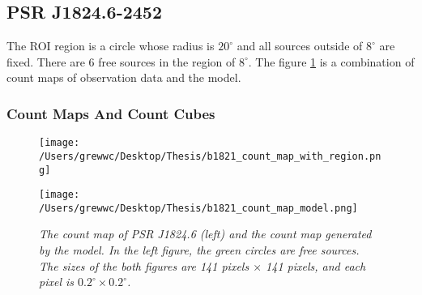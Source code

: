 \documentclass[12pt]{report}
\newcommand{\mycaption}[1]{\caption{\textit{\footnotesize #1}}}
\newcommand{\singleFig}[3]{
 \begin{figure}[!ht]
  \centering
  \texttt{[image: /Users/grewwc/Desktop/Thesis/\#1]}
  \mycaption{#3}
 \label{fig: #1}
 \end{figure}
 \vspace{0.5cm} 
}
\newcommand{\Notice}[1]{
  $<$\textbf{Notice}$>$#1$<$\textbf{/Notice}$>$
}
\begin{document}

            \subsection{PSR J1824.6-2452}
              The ROI region is a circle whose radius is $20^\circ$ and all sources outside of $8^\circ$ are fixed. 
              There are 6 free sources in the region of $8^\circ$. The figure 
              \ref{fig: b1821_count_map_with_region_and_model} 
              is a combination of count maps of observation data and the model. 

              \subsubsection{Count Maps And Count Cubes}
              \begin{figure}[!ht]
                \begin{center}
                \begin{minipage}{0.45\textwidth}
                  \begin{center} 
                    \texttt{[image: /Users/grewwc/Desktop/Thesis/b1821\_count\_map\_with\_region.png]}
                  \end{center}
                \end{minipage}
                \begin{minipage}{0.45\textwidth}
                  \begin{center}
                    \texttt{[image: /Users/grewwc/Desktop/Thesis/b1821\_count\_map\_model.png]}
                  \end{center}
                \end{minipage}
              \end{center}

                \centering
                \begin{minipage}{\textwidth}
                  \mycaption{The count map of PSR J1824.6 (left) and the count map generated by the model. In the left figure,
                  the green circles are free sources.
                  The sizes of the both figures are 141 pixels $\times$ 141 pixels, 
                  and each pixel is $0.2^\circ \times 0.2^\circ$. 
                  }
                  \label{fig: b1821_count_map_with_region_and_model}
                \end{minipage}
              \end{figure}
            
\end{document}
